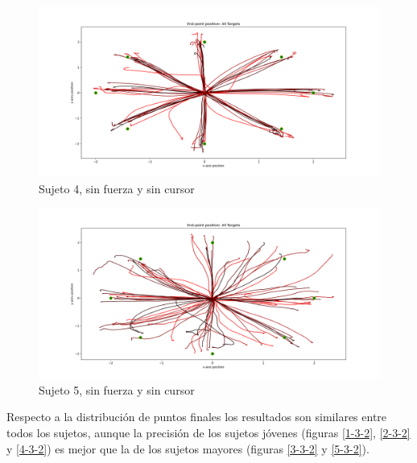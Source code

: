 \documentclass[a4paper,11pt, oneside]{book}
\begin{document}
\begin{figure}[H]
	\includegraphics[width=\linewidth]{sujeto4/no_force_no_cursor/trayectorias}
	\caption{Sujeto 4, sin  fuerza y sin cursor}
	\label{4-3-1}
\end{figure}
\begin{figure}[H]
	\includegraphics[width=\linewidth]{sujeto5/no_force_no_cursor/trayectorias}
	\caption{Sujeto 5, sin  fuerza y sin cursor}
	\label{5-3-1}
\end{figure}

Respecto a la distribución de puntos finales los resultados son similares entre todos los sujetos, aunque la precisión de los sujetos jóvenes (figuras \ref{1-3-2}, \ref{2-3-2} y \ref{4-3-2}) es mejor que la de los sujetos mayores (figuras \ref{3-3-2} y \ref{5-3-2}).
\end{document}
